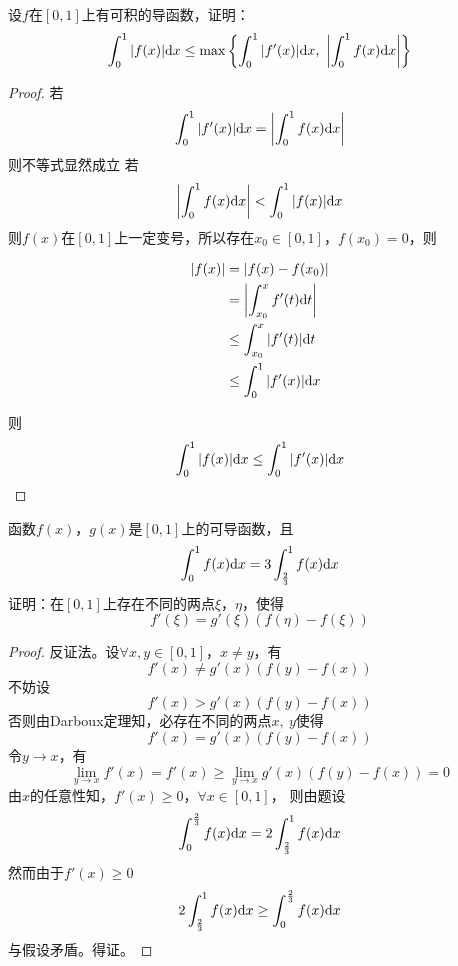 \begin{proposition}

    设$f$在$[0,1]$上有可积的导函数，证明：
    $$\int_{0}^{1}{|f(x)|}\mathrm{d} x \leq \max\left\{\int_{0}^{1}{|f'(x)|}\mathrm{d} x,\  \left|\int_{0}^{1}{f(x)}\mathrm{d} x\right|\right\}$$

\end{proposition}

\begin{proof}
    
    若
    $$\int_{0}^{1}{|f'(x)|}\mathrm{d} x = \left|\int_{0}^{1}{f(x)}\mathrm{d} x\right|$$
    则不等式显然成立
    若
    $$\left|\int_{0}^{1}{f(x)}\mathrm{d} x\right| < \int_{0}^{1}{|f(x)|}\mathrm{d} x$$
    则$f(x)$在$[0,1]$上一定变号，所以存在$x_0 \in [0,1]$，$f(x_0) = 0$，则

    \begin{align*}
        |f(x)| & = |f(x) - f(x_0)| \\
        & = \left|\int_{x_0}^{x}{f'(t)}\mathrm{d} t\right| \\
        & \leq \int_{x_0}^{x}{|f'(t)|}\mathrm{d} t \\
        & \leq \int_{0}^{1}{|f'(x)|}\mathrm{d} x
    \end{align*}

    则
    $$\int_{0}^{1}{|f(x)|}\mathrm{d} x \leq \int_{0}^{1}{|f'(x)|}\mathrm{d} x$$

\end{proof}

\begin{proposition}
    
    函数$f(x)$，$g(x)$是$[0,1]$上的可导函数，且
    $$\int_{0}^{1}{f(x)}\mathrm{d} x = 3 \int_{\frac{2}{3}}^{1}{f(x)}\mathrm{d} x$$
    证明：在$[0,1]$上存在不同的两点$\xi$，$\eta$，使得
    $$f'(\xi) = g'(\xi)(f(\eta) - f(\xi))$$

\end{proposition}

\begin{proof}

    反证法。设$\forall x,y \in [0,1]$，$x \neq y$，有
    $$f'(x) \neq g'(x)(f(y) - f(x))$$
    不妨设
    $$f'(x) > g'(x)(f(y) - f(x))$$
    否则由\textup{Darboux}定理知，必存在不同的两点$x,\ y$使得
    $$f'(x) = g'(x)(f(y) - f(x))$$
    令$y \to x$，有
    $$\lim\limits_{y \to x}{f'(x)} = f'(x) \geq \lim\limits_{y \to x}{g'(x)(f(y) - f(x))} = 0$$
    由$x$的任意性知，$f'(x) \geq 0$，$\forall x \in [0,1]$，
    则由题设
    $$\int_{0}^{\frac{2}{3}}{f(x)}\mathrm{d} x = 2 \int_{\frac{2}{3}}^{1}{f(x)}\mathrm{d} x$$
    然而由于$f'(x) \geq 0$
    $$2 \int_{\frac{2}{3}}^{1}{f(x)}\mathrm{d} x \geq \int_{0}^{\frac{2}{3}}{f(x)}\mathrm{d} x $$
    与假设矛盾。得证。

\end{proof}

